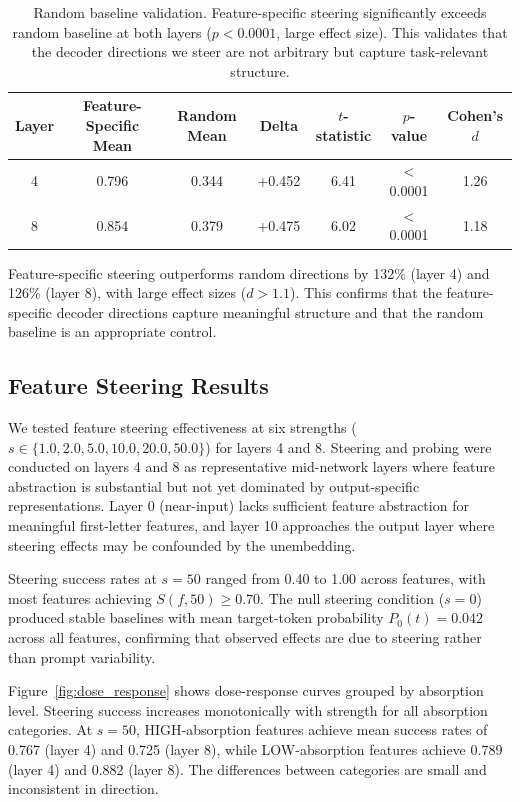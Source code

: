 \documentclass{article}
\begin{document}
\begin{table}[t]
\caption{Random baseline validation. Feature-specific steering significantly exceeds random baseline at both layers ($p < 0.0001$, large effect size). This validates that the decoder directions we steer are not arbitrary but capture task-relevant structure.}
\label{tab:baseline}
\centering
\small
\begin{tabular}{@{}ccccccc@{}}
\toprule
Layer & Feature-Specific Mean & Random Mean & Delta & $t$-statistic & $p$-value & Cohen's $d$ \\
\midrule
4     & 0.796                 & 0.344       & +0.452& 6.41          & $<$0.0001 & 1.26        \\
8     & 0.854                 & 0.379       & +0.475& 6.02          & $<$0.0001 & 1.18        \\
\bottomrule
\end{tabular}
\end{table}

Feature-specific steering outperforms random directions by 132\% (layer 4) and 126\% (layer 8), with large effect sizes ($d > 1.1$). This confirms that the feature-specific decoder directions capture meaningful structure and that the random baseline is an appropriate control.

\subsection{Feature Steering Results}
\label{sec:steering_results}

We tested feature steering effectiveness at six strengths ($s \in \{1.0, 2.0, 5.0, 10.0, 20.0, 50.0\}$) for layers 4 and 8. Steering and probing were conducted on layers 4 and 8 as representative mid-network layers where feature abstraction is substantial but not yet dominated by output-specific representations. Layer 0 (near-input) lacks sufficient feature abstraction for meaningful first-letter features, and layer 10 approaches the output layer where steering effects may be confounded by the unembedding.

Steering success rates at $s = 50$ ranged from 0.40 to 1.00 across features, with most features achieving $S(f, 50) \geq 0.70$. The null steering condition ($s = 0$) produced stable baselines with mean target-token probability $P_0(t) = 0.042$ across all features, confirming that observed effects are due to steering rather than prompt variability.

Figure~\ref{fig:dose_response} shows dose-response curves grouped by absorption level. Steering success increases monotonically with strength for all absorption categories. At $s = 50$, HIGH-absorption features achieve mean success rates of 0.767 (layer 4) and 0.725 (layer 8), while LOW-absorption features achieve 0.789 (layer 4) and 0.882 (layer 8). The differences between categories are small and inconsistent in direction.
\end{document}
